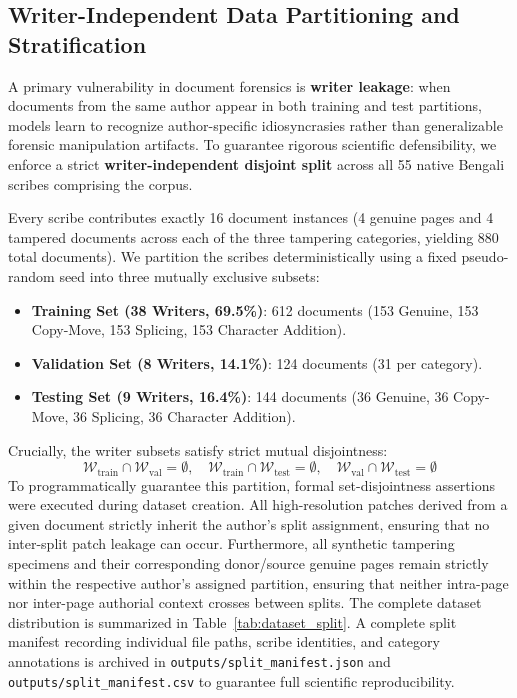 \documentclass[pdflatex,sn-mathphys-num,iicol]{sn-jnl}
\begin{document}
\subsection{Writer-Independent Data Partitioning and Stratification}\label{subsec3_4}
A primary vulnerability in document forensics is \textbf{writer leakage}: when documents from the same author appear in both training and test partitions, models learn to recognize author-specific idiosyncrasies rather than generalizable forensic manipulation artifacts. To guarantee rigorous scientific defensibility, we enforce a strict \textbf{writer-independent disjoint split} across all 55 native Bengali scribes comprising the corpus.

Every scribe contributes exactly 16 document instances (4 genuine pages and 4 tampered documents across each of the three tampering categories, yielding 880 total documents). We partition the scribes deterministically using a fixed pseudo-random seed into three mutually exclusive subsets:
\begin{itemize}
    \item \textbf{Training Set (38 Writers, 69.5\%)}: 612 documents (153 Genuine, 153 Copy-Move, 153 Splicing, 153 Character Addition).
    \item \textbf{Validation Set (8 Writers, 14.1\%)}: 124 documents (31 per category).
    \item \textbf{Testing Set (9 Writers, 16.4\%)}: 144 documents (36 Genuine, 36 Copy-Move, 36 Splicing, 36 Character Addition).
\end{itemize}

\noindent
Crucially, the writer subsets satisfy strict mutual disjointness:
\begin{equation}
\mathcal{W}_{\text{train}} \cap \mathcal{W}_{\text{val}} = \emptyset, \quad \mathcal{W}_{\text{train}} \cap \mathcal{W}_{\text{test}} = \emptyset, \quad \mathcal{W}_{\text{val}} \cap \mathcal{W}_{\text{test}} = \emptyset
\end{equation}
To programmatically guarantee this partition, formal set-disjointness assertions were executed during dataset creation. All high-resolution patches derived from a given document strictly inherit the author's split assignment, ensuring that no inter-split patch leakage can occur. Furthermore, all synthetic tampering specimens and their corresponding donor/source genuine pages remain strictly within the respective author's assigned partition, ensuring that neither intra-page nor inter-page authorial context crosses between splits. The complete dataset distribution is summarized in Table~\ref{tab:dataset_split}. A complete split manifest recording individual file paths, scribe identities, and category annotations is archived in \texttt{outputs/split\_manifest.json} and \texttt{outputs/split\_manifest.csv} to guarantee full scientific reproducibility.
\end{document}
